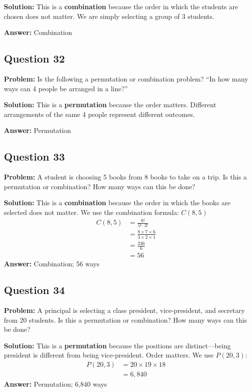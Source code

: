 \documentclass[12pt]{article}
\begin{document}
\textbf{Solution:} This is a \textbf{combination} because the order in which the students are chosen does not matter. We are simply selecting a group of 3 students.

\textbf{Answer:} Combination

\subsection*{Question 32}
\textbf{Problem:} Is the following a permutation or combination problem? ``In how many ways can 4 people be arranged in a line?''

\textbf{Solution:} This is a \textbf{permutation} because the order matters. Different arrangements of the same 4 people represent different outcomes.

\textbf{Answer:} Permutation

\subsection*{Question 33}
\textbf{Problem:} A student is choosing 5 books from 8 books to take on a trip. Is this a permutation or combination? How many ways can this be done?

\textbf{Solution:} This is a \textbf{combination} because the order in which the books are selected does not matter. We use the combination formula: $C(8,5)$
\begin{align*}
C(8,5) &= \frac{8!}{5! \cdot 3!} \\
&= \frac{8 \times 7 \times 6}{3 \times 2 \times 1} \\
&= \frac{336}{6} \\
&= 56
\end{align*}
\textbf{Answer:} Combination; 56 ways

\subsection*{Question 34}
\textbf{Problem:} A principal is selecting a class president, vice-president, and secretary from 20 students. Is this a permutation or combination? How many ways can this be done?

\textbf{Solution:} This is a \textbf{permutation} because the positions are distinct—being president is different from being vice-president. Order matters. We use $P(20,3)$:
\begin{align*}
P(20,3) &= 20 \times 19 \times 18 \\
&= 6{,}840
\end{align*}
\textbf{Answer:} Permutation; 6,840 ways
\end{document}
